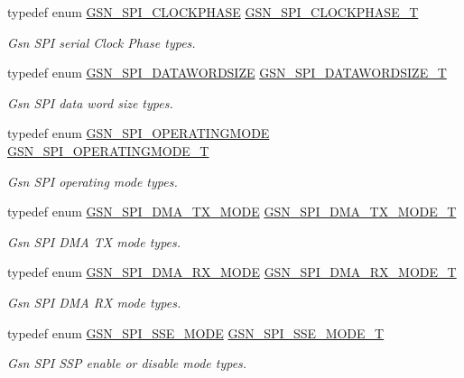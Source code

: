 \begin{DoxyCompactItemize}
typedef enum \hyperlink{a00655_gad25e484c9005210b7db2528764be5034}{GSN\_\-SPI\_\-CLOCKPHASE} \hyperlink{a00655_ga1399b803d30956e8ed6f4929033329ad}{GSN\_\-SPI\_\-CLOCKPHASE\_\-T}
\begin{DoxyCompactList}\small\item\em Gsn SPI serial Clock Phase types. \end{DoxyCompactList}\item 
typedef enum \hyperlink{a00655_ga52e3e63232981dd9e13226ef140541bf}{GSN\_\-SPI\_\-DATAWORDSIZE} \hyperlink{a00655_ga63cbe81427185213bde26b93dde72747}{GSN\_\-SPI\_\-DATAWORDSIZE\_\-T}
\begin{DoxyCompactList}\small\item\em Gsn SPI data word size types. \end{DoxyCompactList}\item 
typedef enum \hyperlink{a00655_ga4b04f6b757fd4a767ea05de3de79ad15}{GSN\_\-SPI\_\-OPERATINGMODE} \hyperlink{a00655_ga6621383791d81630bc4c294a7a3d292d}{GSN\_\-SPI\_\-OPERATINGMODE\_\-T}
\begin{DoxyCompactList}\small\item\em Gsn SPI operating mode types. \end{DoxyCompactList}\item 
typedef enum \hyperlink{a00655_gaf480fa60c7e6a9f132d47f0630a61b1a}{GSN\_\-SPI\_\-DMA\_\-TX\_\-MODE} \hyperlink{a00655_ga39efef290b5dfeaaa7892823d6bfd724}{GSN\_\-SPI\_\-DMA\_\-TX\_\-MODE\_\-T}
\begin{DoxyCompactList}\small\item\em Gsn SPI DMA TX mode types. \end{DoxyCompactList}\item 
typedef enum \hyperlink{a00655_ga21afd388959dd6b6c022109aa9a42586}{GSN\_\-SPI\_\-DMA\_\-RX\_\-MODE} \hyperlink{a00655_ga884b22be3cf70e4b96a0cda9b704390a}{GSN\_\-SPI\_\-DMA\_\-RX\_\-MODE\_\-T}
\begin{DoxyCompactList}\small\item\em Gsn SPI DMA RX mode types. \end{DoxyCompactList}\item 
typedef enum \hyperlink{a00655_ga03895c293b4a0520478212a5a031020d}{GSN\_\-SPI\_\-SSE\_\-MODE} \hyperlink{a00655_ga723e51f459ebae16b20d05a39ffd311a}{GSN\_\-SPI\_\-SSE\_\-MODE\_\-T}
\begin{DoxyCompactList}\small\item\em Gsn SPI SSP enable or disable mode types. \end{DoxyCompactList}\item 

\end{DoxyCompactItemize}
